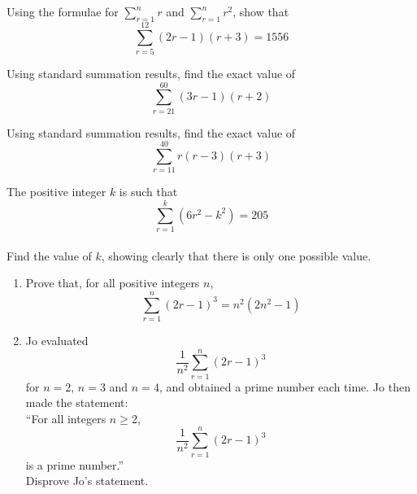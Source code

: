 \documentclass[leqno]{article}
\begin{document}
\djsFrontMatter
\begin{enumerate}[
  label=\textbf{\arabic*.},
  leftmargin=*,
  topsep=0pt,
  partopsep=0pt,
  parsep=0pt
]

\questionitem

Using the formulae for $\sum_{r=1}^{n} r$ and $\sum_{r=1}^{n} r^2$, show that
\[\sum_{r=5}^{12} (2r-1)(r+3) = 1556\] 

\newpage

\questionitem

Using standard summation results, find the exact value of
\[\sum_{r=21}^{60} (3r-1)(r+2)\] 

\newpage

\questionitem

Using standard summation results, find the exact value of
\[\sum_{r=11}^{40} r(r-3)(r+3)\] 

\newpage

\questionitem

The positive integer $k$ is such that
\[\sum_{r=1}^{k} \left(6r^2 - k^2\right) = 205\] \\
Find the value of $k$, showing clearly that there is only one possible value.  \\

\newpage

\questionitem

\begin{enumerate}[label=\textbf{(\alph*)}]
  \item Prove that, for all positive integers $n$,
  \[\sum_{r=1}^{n} (2r-1)^3 = n^2\left(2n^2-1\right)\] 
  \item Jo evaluated
  \[\dfrac{1}{n^2}\sum_{r=1}^{n} (2r-1)^3\]
  for $n = 2$, $n = 3$ and $n = 4$, and obtained a prime number each time. Jo then made the statement: \\

  ``For all integers $n \geq 2$,
  \[\dfrac{1}{n^2}\sum_{r=1}^{n} (2r-1)^3\]
  is a prime number.'' \\

  Disprove Jo's statement.  \\
\end{enumerate}


\end{enumerate}
\end{document}
